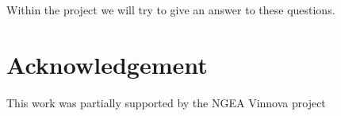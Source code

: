 \documentclass{llncs}
\begin{document}
Within the project we will try to give an answer to these questions.


\section*{Acknowledgement}
This work was partially supported by the NGEA Vinnova
project 


	

\clearpage
% 
\end{document}
